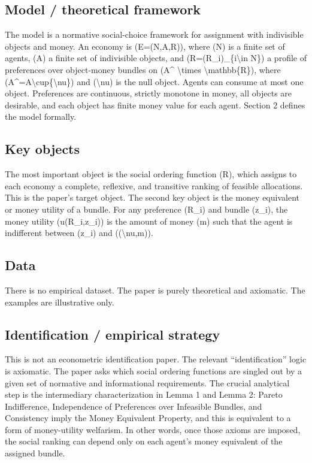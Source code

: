 \documentclass[11pt,a4paper]{article}
\begin{document}
\subsection*{Model / theoretical framework}
The model is a normative social-choice framework for assignment with indivisible objects and money. An economy is (E=(N,A,R)), where (N) is a finite set of agents, (A) a finite set of indivisible objects, and (R=(R\_i)\_\{i\textbackslash{}in N\}) a profile of preferences over object-money bundles on (A\textasciicircum{} \textbackslash{}times \textbackslash{}mathbb\{R\}), where (A\textasciicircum{}=A\textbackslash{}cup\{\textbackslash{}nu\}) and (\textbackslash{}nu) is the null object. Agents can consume at most one object. Preferences are continuous, strictly monotone in money, all objects are desirable, and each object has finite money value for each agent. Section 2 defines the model formally.

\subsection*{Key objects}
The most important object is the social ordering function (R), which assigns to each economy a complete, reflexive, and transitive ranking of feasible allocations. This is the paper’s target object. The second key object is the money equivalent or money utility of a bundle. For any preference (R\_i) and bundle (z\_i), the money utility (u(R\_i,z\_i)) is the amount of money (m) such that the agent is indifferent between (z\_i) and ((\textbackslash{}nu,m)).

\subsection*{Data}
There is no empirical dataset. The paper is purely theoretical and axiomatic. The examples are illustrative only.

\subsection*{Identification / empirical strategy}
This is not an econometric identification paper. The relevant “identification” logic is axiomatic. The paper asks which social ordering functions are singled out by a given set of normative and informational requirements. The crucial analytical step is the intermediary characterization in Lemma 1 and Lemma 2: Pareto Indifference, Independence of Preferences over Infeasible Bundles, and Consistency imply the Money Equivalent Property, and this is equivalent to a form of money-utility welfarism. In other words, once those axioms are imposed, the social ranking can depend only on each agent’s money equivalent of the assigned bundle.
\end{document}
